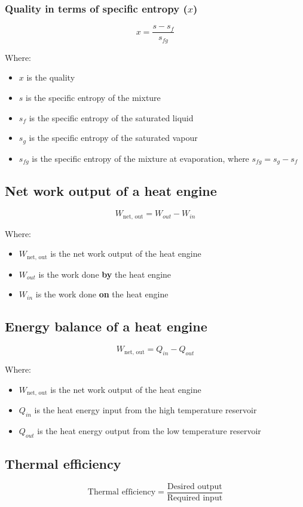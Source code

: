 \documentclass[11pt]{article}
\begin{document}
\subsubsection{Quality in terms of specific entropy (\(x\))}
\label{sec:orgba9b6f8}
\[x = \frac{s - s_f}{s_{fg}}\]

Where:
\begin{itemize}
\item \(x\) is the quality
\item \(s\) is the specific entropy of the mixture
\item \(s_f\) is the specific entropy of the saturated liquid
\item \(s_g\) is the specific entropy of the saturated vapour
\item \(s_{fg}\) is the specific entropy of the mixture at evaporation, where \(s_{fg} = s_g - s_f\)
\end{itemize}

\subsection{Net work output of a heat engine}
\label{sec:org8350437}
\[W_{\text{net, out}} = W_{out} - W_{in}\]

Where:
\begin{itemize}
\item \(W_{\text{net, out}}\) is the net work output of the heat engine
\item \(W_{out}\) is the work done \textbf{by} the heat engine
\item \(W_{in}\) is the work done \textbf{on} the heat engine
\end{itemize}

\subsection{Energy balance of a heat engine}
\label{sec:org986e950}
\[W_{\text{net, out}} = Q_{in} - Q_{out}\]

Where:
\begin{itemize}
\item \(W_{\text{net, out}}\) is the net work output of the heat engine
\item \(Q_{in}\) is the heat energy input from the high temperature reservoir
\item \(Q_{out}\) is the heat energy output from the low temperature reservoir
\end{itemize}

\subsection{Thermal efficiency}
\label{sec:org4c36e52}
\[\text{Thermal efficiency} = \frac{\text{Desired output}}{\text{Required input}}\]
\end{document}
